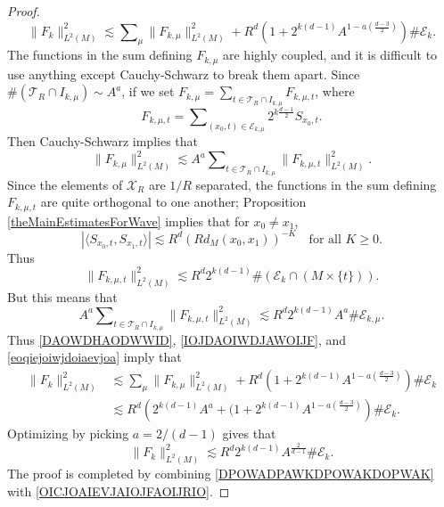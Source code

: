 \begin{proof}
    \begin{equation} \label{DAOWDHAODWWID}
        \| F_k \|_{L^2(M)}^2 \lesssim \sum\nolimits_\mu \| F_{k,\mu} \|_{L^2(M)}^2 + R^{d} \left( 1 + 2^{k(d-1)} A^{1 - a \left( \frac{d-3}{2} \right)} \right) \# \mathcal{E}_k.
    \end{equation}
%
The functions in the sum defining $F_{k,\mu}$ are highly coupled, and it is difficult to use anything except Cauchy-Schwarz to break them apart. Since $\# ( \mathcal{T}_R \cap I_{k,\mu}) \sim A^a$, if we set $F_{k,\mu} = \sum_{t \in \mathcal{T}_R \cap I_{k,\mu}} F_{k,\mu,t}$, where
%
\begin{equation}
    F_{k,\mu,t} = \sum\nolimits_{(x_0,t) \in \mathcal{E}_{k,\mu}} 2^{k \frac{d-1}{2}} {S\!}_{x_0,t}.
\end{equation}
%
Then Cauchy-Schwarz implies that
%
\begin{equation} \label{IOJDAOIWDJAWOIJF}
    \| F_{k,\mu} \|_{L^2(M)}^2 \lesssim A^a \sum\nolimits_{t \in \mathcal{T}_R \cap I_{k,\mu}} \| F_{k,\mu,t} \|_{L^2(M)}^2.
\end{equation}
%
Since the elements of $\mathcal{X}_R$ are $1/R$ separated, the functions in the sum defining $F_{k,\mu,t}$ are quite orthogonal to one another; Proposition \ref{theMainEstimatesForWave} implies that for $x_0 \neq x_1$,
%
\begin{equation}
    |\langle {S\!}_{x_0,t}, {S\!}_{x_1,t} \rangle| \lesssim R^d ( R d_M(x_0,x_1) )^{-K} \quad\text{for all $K \geq 0$}.
\end{equation}
%
Thus
%
\begin{equation}
    \| F_{k,\mu,t} \|_{L^2(M)}^2 \lesssim R^{d} 2^{k(d-1)} \# (\mathcal{E}_k \cap (M \times \{ t \})).
\end{equation}
%
But this means that
%
\begin{equation} \label{eoqiejoiwjdoiaevjoa}
    A^a \sum\nolimits_{t \in \mathcal{T}_R \cap I_{k,\mu}} \| F_{k,\mu,t} \|_{L^2(M)}^2 \lesssim R^{d} 2^{k(d-1)} A^a \# \mathcal{E}_{k,\mu}.
\end{equation}
%
Thus \eqref{DAOWDHAODWWID}, \eqref{IOJDAOIWDJAWOIJF}, and \eqref{eoqiejoiwjdoiaevjoa} imply that
%
\begin{equation}
\begin{split}
    \| F_k \|_{L^2(M)}^2 &\lesssim \sum\nolimits_\mu \| F_{k,\mu} \|_{L^2(M)}^2 + R^{d} \left( 1 + 2^{k(d-1)} A^{1 - a \left( \frac{d-3}{2} \right)} \right) \# \mathcal{E}_k\\
    &\lesssim R^{d} \left( 2^{k(d-1)} A^a + (1 + 2^{k(d-1)} A^{1 - a \left( \frac{d-3}{2} \right)} \right) \# \mathcal{E}_k.
\end{split}
\end{equation}
%
Optimizing by picking $a = 2 / (d-1)$ gives that
%
\begin{equation} \label{OICJOAIEVJAIOJFAOIJRIO}
    \| F_k \|_{L^2(M)}^2 \lesssim R^{d} 2^{k(d-1)} A^{\frac{2}{d-1}} \# \mathcal{E}_k.
\end{equation}
%
The proof is completed by combining \eqref{DPOWADPAWKDPOWAKDOPWAK} with \eqref{OICJOAIEVJAIOJFAOIJRIO}.
\end{proof}






